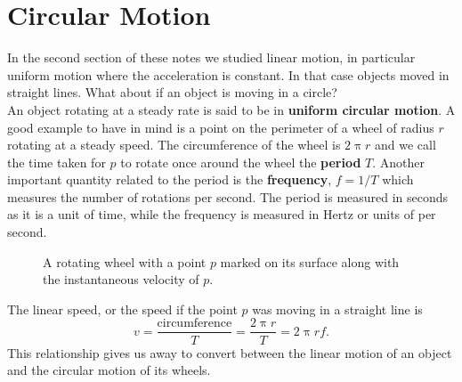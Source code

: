 \section{Circular Motion}
In the second section of these notes we studied linear motion, in particular uniform motion where the acceleration is constant. In that case objects moved in straight lines. What about if an object is moving in a circle?\\

An object rotating at a steady rate is said to be in \textbf{uniform circular motion}. A good example to have in mind is a point on the perimeter of a wheel of radius $r$ rotating at a steady speed. The circumference of the wheel is $2\uppi r$ and we call the time taken for $p$ to rotate once around the wheel the \textbf{period} $T$. Another important quantity related to the period is the \textbf{frequency}, $f=1/T$ which measures the number of rotations per second. The period is measured in seconds as it is a unit of time, while the frequency is measured in Hertz or units of per second.\\

\begin{figure}[ht]
    \centering
    \caption{A rotating wheel with a point $p$ marked on its surface along with the instantaneous velocity of $p$.}
        \label{fig: pt on a wheel}
\end{figure}

The linear speed, or the speed if the point $p$ was moving in a straight line is 
\begin{equation*}
v=\frac{\text{circumference}}{T}=\frac{2\uppi r}{T}=2\uppi r f.
\end{equation*}
This relationship gives us away to convert between the linear motion of an object and the circular motion of its wheels.


